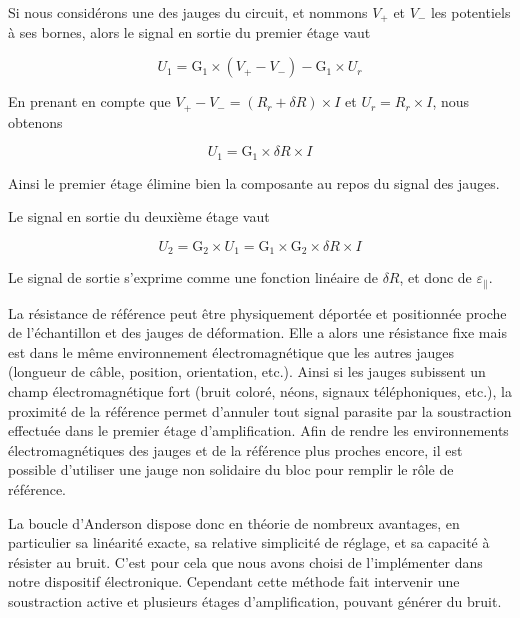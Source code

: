 Si nous considérons une des jauges du circuit, et nommons $V_+$ et $V_-$ les potentiels à ses bornes, alors le signal en sortie du premier étage vaut

\begin{equation}
U_1=\mathrm{G}_1\times(V_+-V_-)-\mathrm{G}_1\times U_r
\end{equation}

En prenant en compte que $V_+-V_- = (R_r+\delta R)\times I$ et $U_r=R_r\times I$, nous obtenons

\begin{equation}
U_1=\mathrm{G}_1\times\delta R \times I
\end{equation}

Ainsi le premier étage élimine bien la composante au repos du signal des jauges.

Le signal en sortie du deuxième étage vaut

\begin{equation}
U_2=\mathrm{G}_2\times U_1=\mathrm{G}_1\times \mathrm{G}_2\times\delta R\times I
\end{equation}

Le signal de sortie s'exprime comme une fonction linéaire de $\delta R$, et donc de $\varepsilon_{\parallel}$.


La résistance de référence peut être physiquement déportée et positionnée proche de l'échantillon et des jauges de déformation. Elle a alors une résistance fixe mais est dans le même environnement électromagnétique que les autres jauges (longueur de câble, position, orientation, etc.). Ainsi si les jauges subissent un champ électromagnétique fort (bruit coloré, néons, signaux téléphoniques, etc.), la proximité de la référence permet d'annuler tout signal parasite par la soustraction effectuée dans le premier étage d'amplification. Afin de rendre les environnements électromagnétiques des jauges et de la référence plus proches encore, il est possible d'utiliser une jauge non solidaire du bloc pour remplir le rôle de référence.

La boucle d'Anderson dispose donc en théorie de nombreux avantages, en particulier sa linéarité exacte, sa relative simplicité de réglage, et sa capacité à résister au bruit. C'est pour cela que nous avons choisi de l'implémenter dans notre dispositif électronique. Cependant cette méthode fait intervenir une soustraction active et plusieurs étages d'amplification, pouvant générer du bruit.







